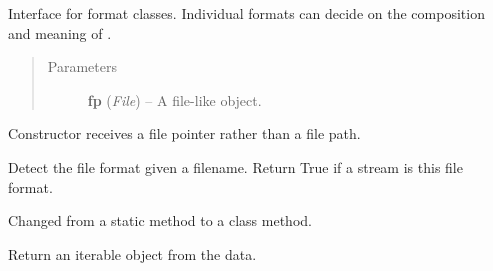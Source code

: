 \documentclass[letterpaper,10pt,english]{sphinxmanual}
\begin{document}
\begin{fulllineitems}
\label{api_reference:textblob.formats.BaseFormat}
Interface for format classes. Individual formats can decide on the
composition and meaning of .
\begin{quote}\begin{description}
\item[{Parameters}] \leavevmode
\textbf{fp} (\emph{File}) -- A file-like object.

\end{description}\end{quote}

Constructor receives a file pointer rather than a file path.

\begin{fulllineitems}
\label{api_reference:textblob.formats.BaseFormat.detect}
Detect the file format given a filename.
Return True if a stream is this file format.

Changed from a static method to a class method.

\end{fulllineitems}


\begin{fulllineitems}
\label{api_reference:textblob.formats.BaseFormat.to_iterable}
Return an iterable object from the data.

\end{fulllineitems}


\end{fulllineitems}

\end{document}
